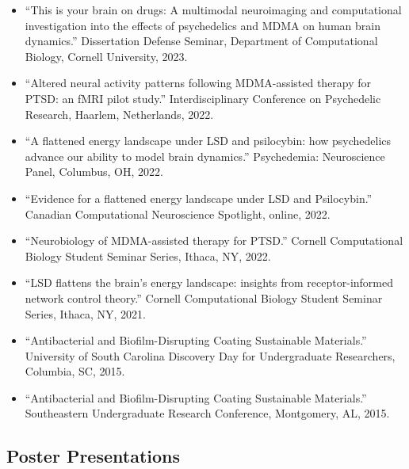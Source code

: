 \documentclass[11pt, letterpaper]{article}
\begin{document}
\begin{itemize}
  \item ``This is your brain on drugs: A multimodal neuroimaging and computational investigation into the effects of psychedelics and MDMA on human brain dynamics.'' Dissertation Defense Seminar, Department of Computational Biology, Cornell University, 2023.
  \item ``Altered neural activity patterns following MDMA-assisted therapy for PTSD: an fMRI pilot study.'' Interdisciplinary Conference on Psychedelic Research, Haarlem, Netherlands, 2022.
  \item ``A flattened energy landscape under LSD and psilocybin: how psychedelics advance our ability to model brain dynamics.'' Psychedemia: Neuroscience Panel, Columbus, OH, 2022.
  \item ``Evidence for a flattened energy landscape under LSD and Psilocybin.'' Canadian Computational Neuroscience Spotlight, online, 2022.
  \item ``Neurobiology of MDMA-assisted therapy for PTSD.'' Cornell Computational Biology Student Seminar Series, Ithaca, NY, 2022.
  \item ``LSD flattens the brain's energy landscape: insights from receptor-informed network control theory.'' Cornell Computational Biology Student Seminar Series, Ithaca, NY, 2021.
  \item ``Antibacterial and Biofilm-Disrupting Coating Sustainable Materials.'' University of South Carolina Discovery Day for Undergraduate Researchers, Columbia, SC, 2015.
  \item ``Antibacterial and Biofilm-Disrupting Coating Sustainable Materials.'' Southeastern Undergraduate Research Conference, Montgomery, AL, 2015.
\end{itemize}

\subsection{Poster Presentations}
\end{document}
